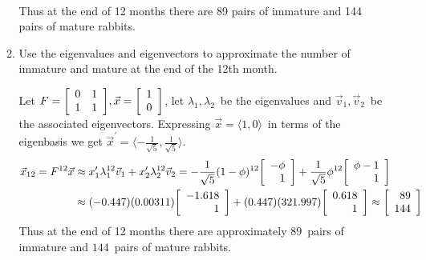 \documentclass{letter}
\newcommand{\Ve}[1]{\langle #1 \rangle}
\newcommand{\Vn}[1]{\vec{#1}}
\newcommand{\?}{\stackrel{?}{=}}
\newcommand\Que[1]{%
   \leavevmode\noindent
   #1
}
\newcommand\Ans[2][]{%
   \leavevmode\noindent
   {
       \begin{mdframed}[backgroundcolor=blue!10]
       #2
       \end{mdframed}
   }
}
\newenvironment{Mat}[1]{%
  \left[\begin{array}{*{#1}{r}}
}{%
  \end{array}\right]
}
\begin{document}
\begin{enumerate}
\begin{enumerate}[label=(\alph*)]
{\begin{align*}
       \end{align*}
       Thus at the end of 12 months there are 89 pairs of immature and 144 pairs of mature rabbits.
    }
    \item \Que{
        Use the eigenvalues and eigenvectors to approximate the number of immature and mature at the end of the 12th month.
    }
    \Ans{
       Let $F=\begin{Mat}{2} 0 & 1 \\ 1 & 1 \end{Mat}, \Vn{x}=\begin{Mat}{1} 1 \\ 0 \end{Mat}$, 
       let $\lambda_1,\lambda_2$\ be the eigenvalues and $\Vn{v}_1, \Vn{v}_2$\ be the associated eigenvectors. 
       Expressing $\Vn{x}=\Ve{1,0}$\ in terms of the eigenbasis we get $\Vn{x}^\prime = \Ve{-\frac{1}{\sqrt{5}},\frac{1}{\sqrt{5}}}$.
       \begin{align*}
           \Vn{x}_{12}=F^{12}\Vn{x} &\approx x_1^\prime\lambda_1^{12}\Vn{v}_1 + x_2^\prime\lambda_2^{12}\Vn{v}_2 
                      = -\frac{1}{\sqrt{5}}(1-\phi)^{12}\begin{Mat}{1}-\phi \\ 1 \end{Mat} 
                      +  \frac{1}{\sqrt{5}}\phi^{12}\begin{Mat}{1} \phi-1 \\ 1 \end{Mat} \\
                      &\approx (-0.447)(0.00311)\begin{Mat}{1} -1.618 \\ 1 \end{Mat}
                             + (0.447)(321.997)\begin{Mat}{1} 0.618 \\ 1 \end{Mat}
                      \approx \begin{Mat}{1} 89 \\ 144 \end{Mat}
       \end{align*}
       Thus at the end of 12 months there are approximately $89$\ pairs of immature and $144$\ pairs of mature rabbits.
    }
    
    \end{enumerate}
    ~\\
    

\end{enumerate}
\end{document}
